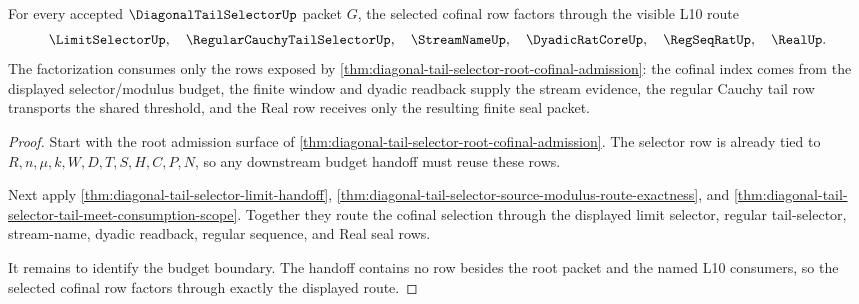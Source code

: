 \begin{theorem}
\label{thm:diagonal-tail-selector-root-budget-handoff}
For every accepted $\DiagonalTailSelectorUp$ packet $G$, the selected
cofinal row factors through the visible L10 route
$$
\LimitSelectorUp,\quad
\RegularCauchyTailSelectorUp,\quad
\StreamNameUp,\quad
\DyadicRatCoreUp,\quad
\RegSeqRatUp,\quad
\RealUp.
$$
The factorization consumes only the rows exposed by
\autoref{thm:diagonal-tail-selector-root-cofinal-admission}: the cofinal
index comes from the displayed selector/modulus budget, the finite window and
dyadic readback supply the stream evidence, the regular Cauchy tail row
transports the shared threshold, and the Real row receives only the resulting
finite seal packet.
\end{theorem}
\begin{proof}
Start with the root admission surface of
\autoref{thm:diagonal-tail-selector-root-cofinal-admission}. The selector row
is already tied to $R,n,\mu,k,W,D,T,S,H,C,P,N$, so any downstream budget
handoff must reuse these rows.

Next apply \autoref{thm:diagonal-tail-selector-limit-handoff},
\autoref{thm:diagonal-tail-selector-source-modulus-route-exactness}, and
\autoref{thm:diagonal-tail-selector-tail-meet-consumption-scope}. Together
they route the cofinal selection through the displayed limit selector,
regular tail-selector, stream-name, dyadic readback, regular sequence, and
Real seal rows.

It remains to identify the budget boundary. The handoff contains no row
besides the root packet and the named L10 consumers, so the selected cofinal
row factors through exactly the displayed route.
\end{proof}

